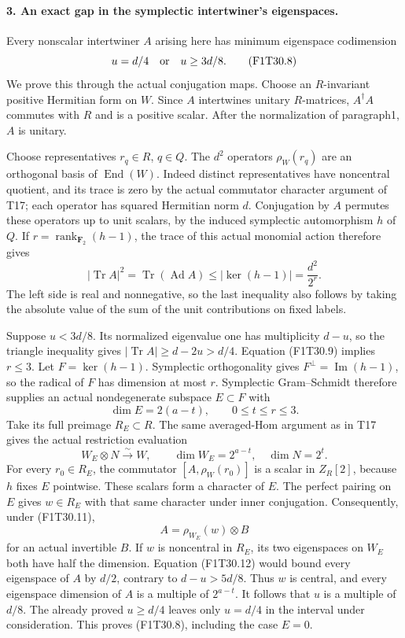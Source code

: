 \paragraph{3. An exact gap in the symplectic intertwiner's eigenspaces.}
Every nonscalar intertwiner \(A\) arising here has
minimum eigenspace codimension
\[
                       u=d/4\quad\hbox{or}\quad u\ge3d/8.
 \tag{F1T30.8}
\]
We prove this through the actual conjugation maps.
Choose an \(R\)-invariant positive Hermitian form on
\(W\). Since \(A\) intertwines unitary \(R\)-matrices,
\(A^\dagger A\) commutes with \(R\) and is a positive
scalar. After the normalization of paragraph1, \(A\)
is unitary.

Choose representatives \(r_q\in R\), \(q\in Q\).
The \(d^2\) operators \(\rho_W(r_q)\) are an orthogonal
basis of \(\operatorname{End}(W)\). Indeed distinct
representatives have noncentral quotient, and its trace
is zero by the actual commutator character argument of
T17; each operator has squared Hermitian norm \(d\).
Conjugation by \(A\) permutes these operators up to
unit scalars, by the induced symplectic automorphism
\(h\) of \(Q\).
If \(r=\operatorname{rank}_{\mathbf F_2}(h-1)\), the
trace of this actual monomial action therefore gives
\[
 |\operatorname{Tr}A|^2
   =\operatorname{Tr}(\operatorname{Ad}A)
   \le |\ker(h-1)|=\frac{d^2}{2^r}.
 \tag{F1T30.9}
\]
The left side is real and nonnegative, so the last
inequality also follows by taking the absolute value
of the sum of the unit contributions on fixed labels.

Suppose \(u<3d/8\). Its normalized eigenvalue one
has multiplicity \(d-u\), so the triangle inequality
gives \(|\operatorname{Tr}A|\ge d-2u>d/4\).
Equation (F1T30.9) implies \(r\le3\).
Let \(F=\ker(h-1)\). Symplectic orthogonality gives
\(F^\perp=\operatorname{Im}(h-1)\), so the radical of
\(F\) has dimension at most \(r\). Symplectic
Gram--Schmidt therefore supplies an actual nondegenerate
subspace \(E\subset F\) with
\[
              \dim E=2(a-t),\qquad 0\le t\le r\le3.
 \tag{F1T30.10}
\]
Take its full preimage \(R_E\subset R\).
The same averaged-Hom argument as in T17 gives the
actual restriction evaluation
\[
                   W_E\otimes N\xrightarrow{\sim}W,
             \qquad \dim W_E=2^{a-t},\quad \dim N=2^t.
 \tag{F1T30.11}
\]
For every \(r_0\in R_E\), the commutator
\([A,\rho_W(r_0)]\) is a scalar in \(Z_R[2]\), because
\(h\) fixes \(E\) pointwise. These scalars form a
character of \(E\). The perfect pairing on \(E\)
gives \(w\in R_E\) with that same character under
inner conjugation. Consequently, under (F1T30.11),
\[
                         A=\rho_{W_E}(w)\otimes B
 \tag{F1T30.12}
\]
for an actual invertible \(B\).
If \(w\) is noncentral in \(R_E\), its two eigenspaces
on \(W_E\) both have half the dimension. Equation
(F1T30.12) would bound every eigenspace of \(A\) by
\(d/2\), contrary to \(d-u>5d/8\).
Thus \(w\) is central, and every eigenspace dimension
of \(A\) is a multiple of \(2^{a-t}\).
It follows that \(u\) is a multiple of \(d/8\).
The already proved \(u\ge d/4\) leaves only \(u=d/4\)
in the interval under consideration. This proves
(F1T30.8), including the case \(E=0\).


